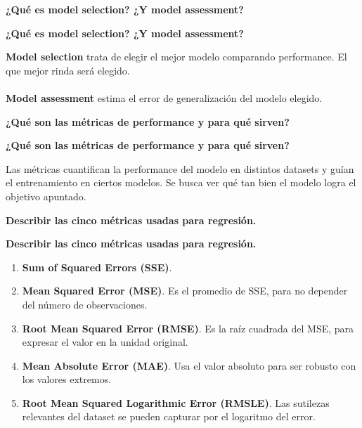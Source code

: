 \documentclass[10pt]{memoir}
\begin{document}
\clearpage
\begin{center}
	\textbf{\Large ¿Qué es model selection? ¿Y model assessment?} \\
\end{center}

\clearpage
\begin{center}
	\textbf{\Large ¿Qué es model selection? ¿Y model assessment?} \\
\end{center}
\noindent \textbf{Model selection} trata de elegir el mejor modelo comparando performance. El que mejor rinda será elegido. \\
\\
\noindent \textbf{Model assessment} estima el error de generalización del modelo elegido.

\clearpage
\begin{center}
	\textbf{\Large ¿Qué son las métricas de performance y para qué sirven?} \\
\end{center}

\clearpage
\begin{center}
	\textbf{\Large ¿Qué son las métricas de performance y para qué sirven?} \\
\end{center}
\noindent Las métricas cuantifican la performance del modelo en distintos datasets y guían el entrenamiento en ciertos modelos. Se busca ver qué tan bien el modelo logra el objetivo apuntado.

\clearpage
\begin{center}
	\textbf{\Large Describir las cinco métricas usadas para regresión.} \\
\end{center}

\clearpage
\begin{center}
	\textbf{\Large Describir las cinco métricas usadas para regresión.} \\
\end{center}
\begin{enumerate}
	\item \textbf{Sum of Squared Errors (SSE)}.
	\item \textbf{Mean Squared Error (MSE)}. Es el promedio de SSE, para no depender del número de observaciones.
	\item \textbf{Root Mean Squared Error (RMSE)}. Es la raíz cuadrada del MSE, para expresar el valor en la unidad original.
	\item \textbf{Mean Absolute Error (MAE)}. Usa el valor absoluto para ser robusto con los valores extremos.
	\item \textbf{Root Mean Squared Logarithmic Error (RMSLE)}. Las sutilezas relevantes del dataset se pueden capturar por el logaritmo del error.
\end{enumerate}
\end{document}
